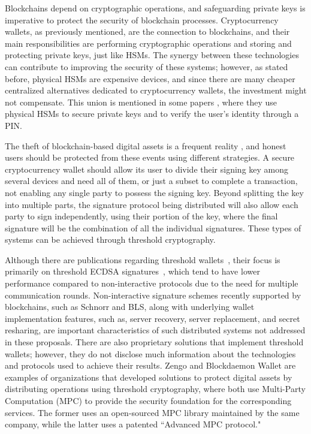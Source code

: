 Blockchains depend on cryptographic operations, and safeguarding private keys is imperative to protect the security of blockchain processes. Cryptocurrency wallets, as previously mentioned, are the connection to blockchains, and their main responsibilities are performing cryptographic operations and storing and protecting private keys, just like HSMs. The synergy between these technologies can contribute to improving the security of these systems; however, as stated before, physical HSMs are expensive devices, and since there are many cheaper centralized alternatives dedicated to cryptocurrency wallets, the investment might not compensate. This union is mentioned in some papers \cite{velinkhsmwallet,hsmbasedewalleteth}, where they use physical HSMs to secure private keys and to verify the user's identity through a PIN.

The theft of blockchain-based digital assets is a frequent reality \cite{cryptothefts2024}, and honest users should be protected from these events using different strategies. A secure cryptocurrency wallet should allow its user to divide their signing key among several devices and need all of them, or just a subset to complete a transaction, not enabling any single party to possess the signing key. Beyond splitting the key into multiple parts, the signature protocol being distributed will also allow each party to sign independently, using their portion of the key, where the final signature will be the combination of all the individual signatures. These types of systems can be achieved through threshold cryptography. 

Although there are publications regarding threshold wallets~\cite{goldfederwallets,bip32wallet,unstoppablewallet,proactivewallet}, their focus is primarily on threshold ECDSA signatures~\cite{gennaro18,damgard20}, which tend to have lower performance compared to non-interactive protocols due to the need for multiple communication rounds. Non-interactive signature schemes recently supported by blockchains, such as Schnorr and BLS, along with underlying wallet implementation features, such as, server recovery, server replacement, and secret resharing, are important characteristics of such distributed systems not addressed in these proposals. There are also proprietary solutions that implement threshold wallets; however, they do not disclose much information about the technologies and protocols used to achieve their results. Zengo \cite{zengowallet} and Blockdaemon Wallet \cite{blockdaemonwallet} are examples of organizations that developed solutions to protect digital assets by distributing operations using threshold cryptography, where both use Multi-Party Computation (MPC) to provide the security foundation for the corresponding services. The former uses an open-sourced MPC library maintained by the same company, while the latter uses a patented ``Advanced MPC protocol."



